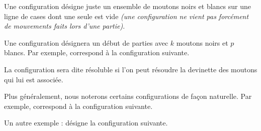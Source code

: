 \begin{definition}
    Une configuration désigne juste un ensemble de moutons noirs et blancs sur une ligne de cases dont une seule est vide \emph{(une configuration ne vient pas forcément de mouvements faits lors d'une partie)}.
\end{definition}


\begin{definition}
    Une configuration  désignera un début de parties avec $k$ moutons noirs et $p$ blancs.
    Par exemple,  correspond à la configuration suivante.
\end{definition}


\begin{definition}
    La configuration  sera dite résoluble si l'on peut résoudre la devinette des moutons qui lui est associée.
\end{definition}


\begin{remark}
    Plus généralement, nous noterons certains configurations de façon naturelle. Par exemple,  correspond à la configuration suivante.


    Un autre exemple :  désigne la configuration suivante.

\end{remark}

